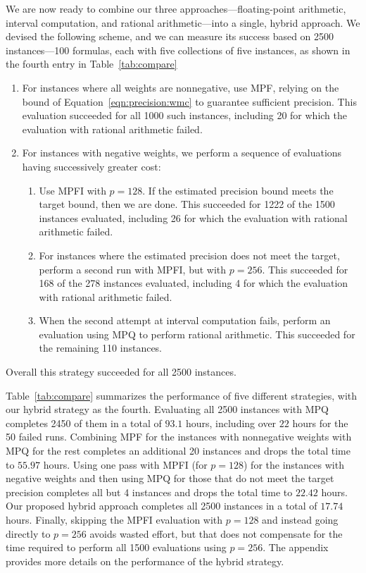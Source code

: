 \documentclass[letterpaper,USenglish,cleveref, autoref, thm-restate]{lipics-v2021}
\begin{document}
We are now ready to combine our three approaches---floating-point
arithmetic, interval computation, and rational arithmetic---into a
single, hybrid approach.  We devised the following scheme, and we can
measure its success based on 2500 instances---100 formulas, each with five collections of five instances, as shown in the fourth entry in Table~\ref{tab:compare}
\begin{enumerate}
\item For instances where all weights are nonnegative, use MPF,
  relying on the bound of Equation~\ref{eqn:precision:wmc} to
  guarantee sufficient precision.  This evaluation succeeded for all 1000 such
  instances, including 20 for which the evaluation with rational arithmetic failed.
\item For instances with negative weights, we perform a sequence of evaluations having successively greater cost:
\begin{enumerate}
\item 
  Use MPFI with $p=128$.  If the estimated precision
  bound meets the target bound, then we are done.  This succeeded for
  1222 of the 1500 instances evaluated, including 26 for which the evaluation with rational arithmetic failed.
\item For instances where the estimated precision does not meet the target, perform a second run with MPFI, but with $p=256$.  This succeeded
  for 168 of the 278 instances evaluated, including 4 for which the evaluation with rational arithmetic failed.
\item When the second attempt at interval computation fails, perform
  an evaluation using MPQ to perform rational arithmetic.  This
  succeeded for the remaining 110 instances.
\end{enumerate}
\end{enumerate}
Overall this strategy succeeded for all 2500 instances.

Table~\ref{tab:compare} summarizes the performance of five different strategies, with our hybrid strategy as the fourth.
Evaluating all 2500
instances with MPQ completes 2450 of them in a
total of $93.1$ hours, including over $22$ hours for the 50 failed
runs.  Combining MPF for the instances with nonnegative weights with MPQ for the rest
completes an
additional 20 instances and drops the total time to $55.97$ hours.
Using one pass with MPFI (for $p=128$)
for the instances with negative weights and then using MPQ for those
that do not meet the target precision completes all but 4 instances
and drops the total time to $22.42$ hours.
Our proposed hybrid approach completes all 2500 instances in a total of
$17.74$ hours.
Finally, skipping the MPFI evaluation with $p=128$ and instead going directly to $p=256$ avoids
wasted effort, but that
does not
compensate for the time required to perform all 1500 evaluations using
$p=256$.  The appendix provides more
details on the performance of the hybrid strategy.
\end{document}
